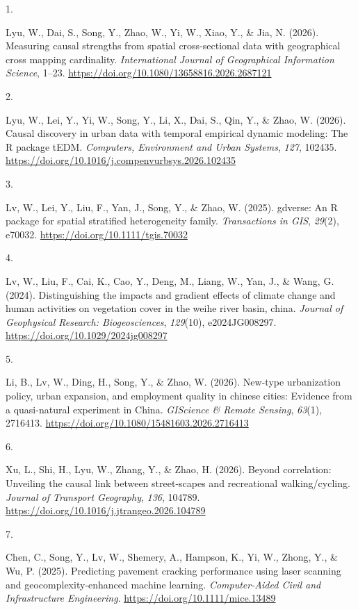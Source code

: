 \documentclass[10pt,a4paper,]{article}
\newlength{\cslhangindent}
\newlength{\csllabelwidth}
\newenvironment{CSLReferences}[2] %
 {\begin{list}{}{%
  \setlength{\itemindent}{0pt}
  \setlength{\leftmargin}{0pt}
  \setlength{\parsep}{0pt}
  \ifodd #1
   \setlength{\leftmargin}{\cslhangindent}
   \setlength{\itemindent}{-1\cslhangindent}
  \fi
  \setlength{\itemsep}{#2\baselineskip}}}
 {\end{list}}
\newcommand{\CSLLeftMargin}[1]{\parbox[t]{\csllabelwidth}{\strut#1\strut}}
\newcommand{\CSLRightInline}[1]{\parbox[t]{\linewidth - \csllabelwidth}{\strut#1\strut}}
\begin{document}
\label{refs-d23da96b40208019b6f3580b0fc3c15f}
\begin{CSLReferences}{0}{0}
\CSLLeftMargin{1. }%
\CSLRightInline{Lyu, W., Dai, S., Song, Y., Zhao, W., Yi, W., Xiao, Y.,
\& Jia, N. (2026). Measuring causal strengths from spatial
cross-sectional data with geographical cross mapping cardinality.
\emph{International Journal of Geographical Information Science}, 1--23.
\url{https://doi.org/10.1080/13658816.2026.2687121}}

\CSLLeftMargin{2. }%
\CSLRightInline{Lyu, W., Lei, Y., Yi, W., Song, Y., Li, X., Dai, S.,
Qin, Y., \& Zhao, W. (2026). Causal discovery in urban data with
temporal empirical dynamic modeling: The R package tEDM.
\emph{Computers, Environment and Urban Systems}, \emph{127}, 102435.
\url{https://doi.org/10.1016/j.compenvurbsys.2026.102435}}

\CSLLeftMargin{3. }%
\CSLRightInline{Lv, W., Lei, Y., Liu, F., Yan, J., Song, Y., \& Zhao, W.
(2025). gdverse: An R package for spatial stratified heterogeneity
family. \emph{Transactions in GIS}, \emph{29}(2), e70032.
\url{https://doi.org/10.1111/tgis.70032}}

\CSLLeftMargin{4. }%
\CSLRightInline{Lv, W., Liu, F., Cai, K., Cao, Y., Deng, M., Liang, W.,
Yan, J., \& Wang, G. (2024). Distinguishing the impacts and gradient
effects of climate change and human activities on vegetation cover in
the weihe river basin, china. \emph{Journal of Geophysical Research:
Biogeosciences}, \emph{129}(10), e2024JG008297.
\url{https://doi.org/10.1029/2024jg008297}}

\CSLLeftMargin{5. }%
\CSLRightInline{Li, B., Lv, W., Ding, H., Song, Y., \& Zhao, W. (2026).
New-type urbanization policy, urban expansion, and employment quality in
chinese cities: Evidence from a quasi-natural experiment in China.
\emph{GIScience \& Remote Sensing}, \emph{63}(1), 2716413.
\url{https://doi.org/10.1080/15481603.2026.2716413}}

\CSLLeftMargin{6. }%
\CSLRightInline{Xu, L., Shi, H., Lyu, W., Zhang, Y., \& Zhao, H. (2026).
Beyond correlation: Unveiling the causal link between street-scapes and
recreational walking/cycling. \emph{Journal of Transport Geography},
\emph{136}, 104789.
\url{https://doi.org/10.1016/j.jtrangeo.2026.104789}}

\CSLLeftMargin{7. }%
\CSLRightInline{Chen, C., Song, Y., Lv, W., Shemery, A., Hampson, K.,
Yi, W., Zhong, Y., \& Wu, P. (2025). Predicting pavement cracking
performance using laser scanning and geocomplexity‐enhanced machine
learning. \emph{Computer-Aided Civil and Infrastructure Engineering}.
\url{https://doi.org/10.1111/mice.13489}}

\end{CSLReferences}
\end{document}
